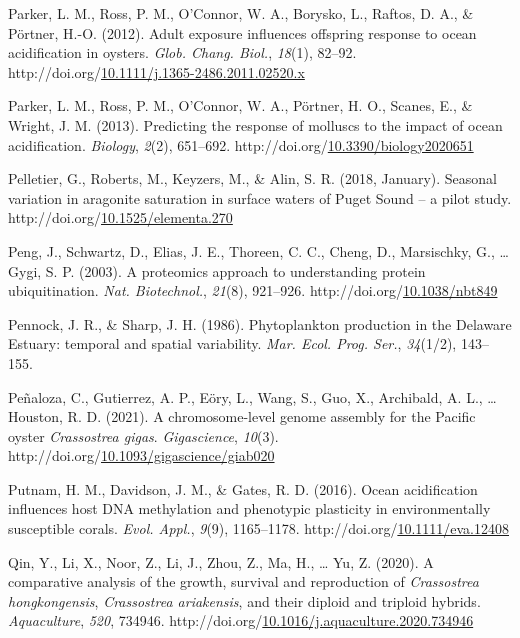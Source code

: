 \documentclass [11pt, proquest] {uwthesis}[2015/03/03]
\newlength{\cslhangindent}
\newenvironment{CSLReferences}%
{\setlength{\parindent}{0pt}%
\everypar{\setlength{\hangindent}{\cslhangindent}}\ignorespaces}%
{\par}
\begin{document}
\begin{CSLReferences}{1}{0}
\leavevmode\hypertarget{ref-Parker2012}{}%
Parker, L. M., Ross, P. M., O'Connor, W. A., Borysko, L., Raftos, D. A., \& Pörtner, H.-O. (2012). {Adult exposure influences offspring response to ocean acidification in oysters}. \emph{Glob. Chang. Biol.}, \emph{18}(1), 82--92. http://doi.org/\href{https://doi.org/10.1111/j.1365-2486.2011.02520.x}{10.1111/j.1365-2486.2011.02520.x}

\leavevmode\hypertarget{ref-Parker2013}{}%
Parker, L. M., Ross, P. M., O'Connor, W. A., Pörtner, H. O., Scanes, E., \& Wright, J. M. (2013). {Predicting the response of molluscs to the impact of ocean acidification}. \emph{Biology}, \emph{2}(2), 651--692. http://doi.org/\href{https://doi.org/10.3390/biology2020651}{10.3390/biology2020651}

\leavevmode\hypertarget{ref-Pelletier2018}{}%
Pelletier, G., Roberts, M., Keyzers, M., \& Alin, S. R. (2018, January). {Seasonal variation in aragonite saturation in surface waters of Puget Sound -- a pilot study}. http://doi.org/\href{https://doi.org/10.1525/elementa.270}{10.1525/elementa.270}

\leavevmode\hypertarget{ref-Peng2003}{}%
Peng, J., Schwartz, D., Elias, J. E., Thoreen, C. C., Cheng, D., Marsischky, G., \ldots{} Gygi, S. P. (2003). {A proteomics approach to understanding protein ubiquitination}. \emph{Nat. Biotechnol.}, \emph{21}(8), 921--926. http://doi.org/\href{https://doi.org/10.1038/nbt849}{10.1038/nbt849}

\leavevmode\hypertarget{ref-Pennock1986}{}%
Pennock, J. R., \& Sharp, J. H. (1986). {Phytoplankton production in the Delaware Estuary: temporal and spatial variability}. \emph{Mar. Ecol. Prog. Ser.}, \emph{34}(1/2), 143--155.

\leavevmode\hypertarget{ref-Penaloza2021}{}%
Peñaloza, C., Gutierrez, A. P., Eöry, L., Wang, S., Guo, X., Archibald, A. L., \ldots{} Houston, R. D. (2021). {A chromosome-level genome assembly for the Pacific oyster \emph{Crassostrea gigas}}. \emph{Gigascience}, \emph{10}(3). http://doi.org/\href{https://doi.org/10.1093/gigascience/giab020}{10.1093/gigascience/giab020}

\leavevmode\hypertarget{ref-Putnam2016}{}%
Putnam, H. M., Davidson, J. M., \& Gates, R. D. (2016). {Ocean acidification influences host DNA methylation and phenotypic plasticity in environmentally susceptible corals}. \emph{Evol. Appl.}, \emph{9}(9), 1165--1178. http://doi.org/\href{https://doi.org/10.1111/eva.12408}{10.1111/eva.12408}

\leavevmode\hypertarget{ref-Qin2020}{}%
Qin, Y., Li, X., Noor, Z., Li, J., Zhou, Z., Ma, H., \ldots{} Yu, Z. (2020). {A comparative analysis of the growth, survival and reproduction of \emph{Crassostrea hongkongensis}, \emph{Crassostrea ariakensis}, and their diploid and triploid hybrids}. \emph{Aquaculture}, \emph{520}, 734946. http://doi.org/\href{https://doi.org/10.1016/j.aquaculture.2020.734946}{10.1016/j.aquaculture.2020.734946}


\end{CSLReferences}
\end{document}
